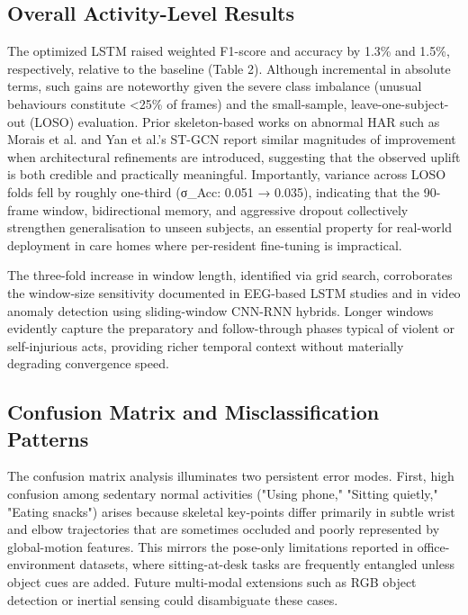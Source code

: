 \documentclass{iopconfser}
\begin{document}
\subsection{Overall Activity-Level Results}

The optimized LSTM raised weighted F1-score and accuracy by 1.3\% and 1.5\%, respectively, relative to the baseline (Table 2). Although incremental in absolute terms, such gains are noteworthy given the severe class imbalance (unusual behaviours constitute <25\% of frames) and the small-sample, leave-one-subject-out (LOSO) evaluation. Prior skeleton-based works on abnormal HAR such as Morais et al. \cite{morais2019learning} and Yan et al.'s ST-GCN \cite{yan2018spatial} report similar magnitudes of improvement when architectural refinements are introduced, suggesting that the observed uplift is both credible and practically meaningful. Importantly, variance across LOSO folds fell by roughly one-third (σ\_Acc: 0.051 → 0.035), indicating that the 90-frame window, bidirectional memory, and aggressive dropout collectively strengthen generalisation to unseen subjects, an essential property for real-world deployment in care homes where per-resident fine-tuning is impractical.

The three-fold increase in window length, identified via grid search, corroborates the window-size sensitivity documented in EEG-based LSTM studies and in video anomaly detection using sliding-window CNN-RNN hybrids. Longer windows evidently capture the preparatory and follow-through phases typical of violent or self-injurious acts, providing richer temporal context without materially degrading convergence speed.

\subsection{Confusion Matrix and Misclassification Patterns}

The confusion matrix analysis illuminates two persistent error modes. First, high confusion among sedentary normal activities ("Using phone," "Sitting quietly," "Eating snacks") arises because skeletal key-points differ primarily in subtle wrist and elbow trajectories that are sometimes occluded and poorly represented by global-motion features. This mirrors the pose-only limitations reported in office-environment datasets, where sitting-at-desk tasks are frequently entangled unless object cues are added. Future multi-modal extensions such as RGB object detection or inertial sensing could disambiguate these cases.
\end{document}
